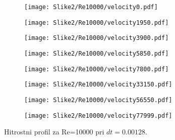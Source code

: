 \documentclass[12pt,a4paper]{article}
\begin{document}
\begin{figure}[H]
    \centering
    \begin{subfigure}[b]{0.2\textwidth}  			
        \texttt{[image: Slike2/Re10000/velocity0.pdf]}
    \end{subfigure}
    \begin{subfigure}[b]{0.2\textwidth}  			
        \texttt{[image: Slike2/Re10000/velocity1950.pdf]}
    \end{subfigure}
    \begin{subfigure}[b]{0.2\textwidth}  			
        \texttt{[image: Slike2/Re10000/velocity3900.pdf]}
    \end{subfigure}
        \begin{subfigure}[b]{0.2\textwidth}  			
        \texttt{[image: Slike2/Re10000/velocity5850.pdf]}
    \end{subfigure}
 
     \begin{subfigure}[b]{0.2\textwidth}  			
        \texttt{[image: Slike2/Re10000/velocity7800.pdf]}
    \end{subfigure}
        \begin{subfigure}[b]{0.2\textwidth}  			
        \texttt{[image: Slike2/Re10000/velocity33150.pdf]}
    \end{subfigure}
        \begin{subfigure}[b]{0.2\textwidth}  			
        \texttt{[image: Slike2/Re10000/velocity56550.pdf]}
    \end{subfigure}
        \begin{subfigure}[b]{0.2\textwidth}  			
        \texttt{[image: Slike2/Re10000/velocity77999.pdf]}
    \end{subfigure}
    \caption{Hitrostni profil za Re=10000 pri $dt=0.00128$.} \label{fig:slika6}
\end{figure}
\end{document}
